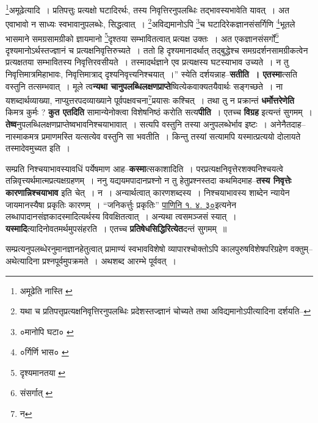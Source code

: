 \documentclass[article,12pt,a4paper]{memoir}
\begin{document}
	\footnote{अमूढेति \cite{dp-msA} \cite{dp-edP} \cite{dp-edE} नास्ति \cite{dp-edH} \cite{dp-edN}}अमूढेत्यादि । प्रतिपत्तुः प्रत्यक्षो घटादिरर्थः, तस्य निवृत्तिरनुपलब्धिः तद्भावस्यभावेति यावत् । अत एवाभावो न साध्यः स्वभावानुपलब्धेः, सिद्धत्वात् । \footnote{यथा च प्रतिपत्तृप्रत्यक्षनिवृत्तिरनुपलब्धिः प्रदेशस्तज्ज्ञानं चोच्यते तथा अविद्यमानोऽपीत्यादिना दर्शयति--\cite{dp-msD-n}}अविद्यमानोऽपि \footnote{०मानोपि घटा० \cite{dp-msC}}च घटादिरेकज्ञानसंसर्गिणि \footnote{०र्गिर्णि भास० \cite{dp-msA} \cite{dp-edE} \cite{dp-edP}}भूतले भासमाने समग्रसामग्रीको ज्ञायमानो \footnote{दृश्यमानतया \cite{dp-msB} \cite{dp-msD} \cite{dp-edH} \cite{dp-edN}}दृश्तया सम्भावितत्वात् प्रत्यक्ष उक्तः । अत एकज्ञानसंसर्गो\footnote{संसर्गात् \cite{dp-msB}} दृश्यमानोऽर्थस्तज्ज्ञानं च प्रत्यक्षनिवृत्तिरुच्यते । ततो हि दृश्यमानादर्थात् तद्बुद्धेश्च समग्रदर्शनसामग्रीकत्वेन प्रत्यक्षतया सम्भावितस्य निवृत्तिरवसीयते । तस्मादर्थज्ञाने एव प्रत्यक्षस्य घटस्याभाव उच्यते । न तु निवृत्तिमात्रमिहाभावः, निवृत्तिमात्राद् दृश्यनिवृत्त्यनिश्चयात् ।” स्येति दर्शयन्नाह--\textbf{सतीति । एतस्मा}त्सति वस्तुनि तत्सम्भवात् । मूले त्व\textbf{न्यथा चानुपलब्धिलक्षणप्राप्ते}ष्वित्येकवाक्यतयैवार्थः सङ्गच्छते । ना यशब्दार्थव्याख्या, नाप्युत्तरपदव्याख्याने पूर्वपक्षवचना\footnote{न}प्रयासः कश्चित् । तथा तु न प्रक्रान्तं \textbf{धर्मोत्तरेणेति} किमत्र कुर्मः ? \textbf{कुत एतदिति} सामान्येनोक्त्वा विशेषनिष्ठं करोति सत्य\textbf{पीति} । एतच्च \textbf{विग्रह} इत्यन्तं सुगमम् । \textbf{तेष्व}नुपलब्धिलक्षणप्राप्तेष्वभावनिश्चयाभावात् । सत्यपि वस्तुनि तस्या अनुपलब्धेर्भाव इष्टः । अनेनैतदाह--नास्माकमत्र प्रमाणमस्ति यत्सत्येव वस्तुनि सा भवतीति । किन्तु तस्यां सत्यामपि यस्मात्प्रत्ययो दोलायते तस्मादेवमुच्यत इति ।
	\pend
      

	  \pstart सम्प्रति निश्चयाभावस्यावधिं पर्येषमाण आह--\textbf{कस्मा}त्सकाशादिति । परप्रत्यक्षनिवृत्तेरशक्यनिश्चयत्वे तन्निवृत्त्यर्थमात्मप्रत्यक्षग्रहणम् । ननु यद्ययमपादानप्रश्नो न तु हेतुप्रश्नस्तदा कथमिदमाह--\textbf{तस्य निवृत्तेः कारणान्निश्चयाभाव} इति चेत् । न । अन्यार्थत्वात् कारणशब्दस्य । निश्चयाभावस्य शाब्देन न्यायेन जायमानस्यैषा प्रकृतिः कारणम् । “जनिकर्त्तुः प्रकृतिः” \href{http://http://sarit.indology.info/?cref=Pā.1.4.30}{पाणिनि १. ४. ३०}इत्यनेन लब्धापादानसंज्ञकादस्मादित्यर्थस्य विवक्षितत्वात् । अन्यथा त्वसमञ्जसं स्यात् । \textbf{यस्मादि}त्यादिनोवतमर्थमुपसंहरति । एतच्च \textbf{प्रतिषेधसिद्धिरित्येत}दन्तं सुगमम् ॥
	\pend
      

	  \pstart सम्प्रत्यनुपलब्धेरनुमानज्ञानहेतुत्वात् प्रामाण्यं स्वभावविशेषो व्यापारश्चोक्तोऽपि कालपुरुषविशेषपरिग्रहेण वक्तुम्--अथेत्यादिना प्रश्नपूर्वमुपक्रमते । अथशब्द आरम्भे पूर्ववत् ।
	\pend
      \leavevmode{}
	  \bigskip
	  \begingroup
	
\end{document}
